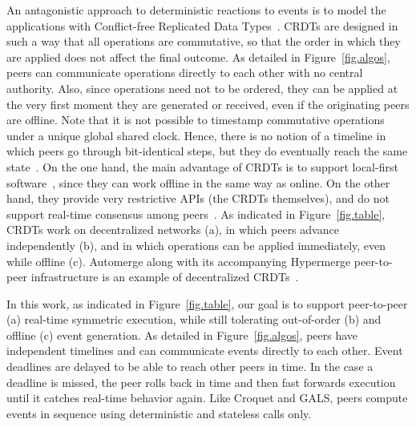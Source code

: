 \documentclass[sn-mathphys,iicol]{sn-jnl}%
\begin{document}
An antagonistic approach to deterministic reactions to events is to model the
applications with Conflict-free Replicated Data Types~\cite{crdts}.
CRDTs are designed in such a way that all operations are commutative, so that
the order in which they are applied does not affect the final outcome.
%
As detailed in Figure~\ref{fig.algos}, peers can communicate operations
directly to each other with no central authority.
Also, since operations need not to be ordered, they can be applied at the
very first moment they are generated or received, even if the originating peers
are offline.
%
Note that it is not possible to timestamp commutative operations under a unique
global shared clock.
Hence, there is no notion of a timeline in which peers go through bit-identical
steps, but they do eventually reach the same state~\cite{crdts.eventual}.
%
On the one hand, the main advantage of CRDTs is to support local-first
software~\cite{local}, since they can work offline in the same way as online.
On the other hand, they provide very restrictive APIs (the CRDTs themselves),
and do not support real-time consensus among peers~\cite{crdts.consensus}.
%
As indicated in Figure~\ref{fig.table}, CRDTs work on decentralized networks
(a), in which peers advance independently (b), and in which operations can be
applied immediately, even while offline (c).
%
Automerge along with its accompanying Hypermerge peer-to-peer infrastructure
is an example of decentralized CRDTs~\cite{p2p.automerge,p2p.pushpin}.

In this work, as indicated in Figure~\ref{fig.table}, our goal is to support
peer-to-peer (a) real-time symmetric execution, while still tolerating
out-of-order (b) and offline (c) event generation.
%
As detailed in Figure~\ref{fig.algos}, peers have independent timelines and
can communicate events directly to each other.
Event deadlines are delayed to be able to reach other peers in time.
In the case a deadline is missed, the peer rolls back in time and then fast
forwards execution until it catches real-time behavior again.
%
Like Croquet and GALS, peers compute events in sequence using deterministic and
stateless calls only.
\end{document}
